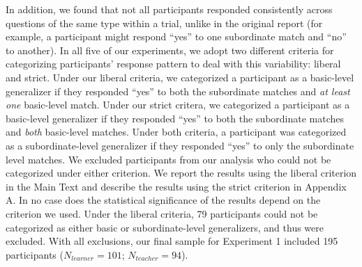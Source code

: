 \documentclass[man]{apa2}
\begin{document}
In addition, we found that not all participants responded consistently across questions of the same type within a trial,  unlike in the original report (for example, a participant might respond ``yes'' to one subordinate match and ``no'' to another). In all five of our experiments, we adopt two different criteria for categorizing participants' response pattern to deal with this variability: liberal and strict. Under our liberal criteria,  we categorized a participant as a basic-level generalizer if they responded ``yes'' to both the subordinate matches and {\it at least one} basic-level match. Under our strict critera, we categorized a participant as a basic-level generalizer if they responded ``yes'' to both the subordinate matches and {\it both} basic-level matches. Under both criteria, a participant was categorized as a subordinate-level generalizer if they responded ``yes'' to only the subordinate level matches. We excluded participants from our analysis who could not be categorized under either criterion. We report the results using the liberal criterion in the Main Text and describe the results using the strict criterion in Appendix A. In no case does the statistical significance of the results depend on the criterion we used. Under the liberal criteria, 79 participants could not be categorized as either basic or subordinate-level generalizers, and thus were excluded. With all exclusions, our final sample for Experiment 1 included 195 participants  ($N_{learner} = 101$; $N_{teacher} = 94$).
\end{document}
